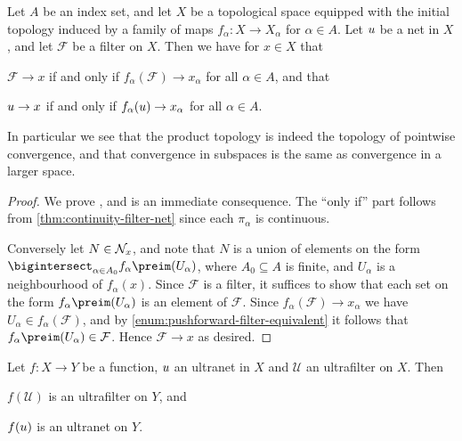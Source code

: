 \documentclass[article, a4paper, 11pt, oneside]{memoir}
\numberwithin{equation}{chapter}
\newcommand{\calU}{\mathcal{U}}
\newcommand{\calF}{\mathcal{F}}
\theoremstyle{nonumberplain}
\begin{document}
\begin{proposition}
    Let $A$ be an index set, and let $X$ be a topological space equipped with the initial topology induced by a family of maps $f_\alpha \colon X \to X_\alpha$ for $\alpha \in A$. Let $u$ be a net in $X$, and let $\calF$ be a filter on $X$. Then we have for $x \in X$ that
    \begin{enumprop}
        \item \label{enum:initial-top-filter-convergence} $\calF \to x$ if and only if $f_\alpha(\calF) \to x_\alpha$ for all $\alpha \in A$, and that
        \item \label{enum:initial-top-net-convergence} $u \to x$ if and only if $f_\alpha(u) \to x_\alpha$ for all $\alpha \in A$.
    \end{enumprop}
\end{proposition}
%
In particular we see that the product topology is indeed the topology of pointwise convergence, and that convergence in subspaces is the same as convergence in a larger space.

\begin{proof}
    We prove , and  is an immediate consequence. The \enquote{only if} part follows from \cref{thm:continuity-filter-net} since each $\pi_\alpha$ is continuous.
    
    Conversely let $N \in \mathcal{N}_{x}$, and note that $N$ is a union of elements on the form $\bigintersect_{\alpha \in A_0} f_\alpha\preim(U_\alpha)$, where $A_0 \subseteq A$ is finite, and $U_\alpha$ is a neighbourhood of $f_\alpha(x)$. Since $\calF$ is a filter, it suffices to show that each set on the form $f_\alpha\preim(U_\alpha)$ is an element of $\calF$. Since $f_\alpha(\calF) \to x_\alpha$ we have $U_\alpha \in f_\alpha(\calF)$, and by \cref{enum:pushforward-filter-equivalent} it follows that $f_\alpha\preim(U_\alpha) \in \calF$. Hence $\calF \to x$ as desired.
\end{proof}


\begin{proposition}
    \label{thm:ultrafilter-pushforward}
    Let $f \colon X \to Y$ be a function, $u$ an ultranet in $X$ and $\calU$ an ultrafilter on $X$. Then
    \begin{enumprop}
        \item \label{enum:ultrafilter-pushforward} $f(\calU)$ is an ultrafilter on $Y$, and
        \item \label{enum:ultranet-pushforward} $f(u)$ is an ultranet on $Y$.
    \end{enumprop}
\end{proposition}
\end{document}
